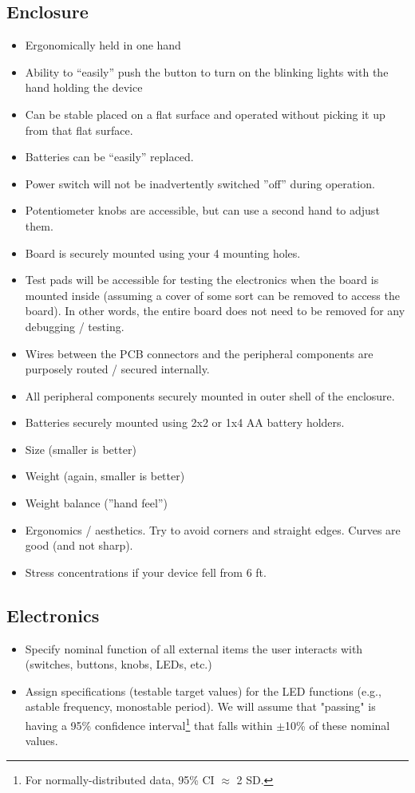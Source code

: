 \documentclass[10pt]{article}
\begin{document}
\subsection{Enclosure}
\begin{itemize}
    \item Ergonomically held in one hand
    \item Ability to “easily” push the button to turn on the blinking lights with the hand holding the device
    \item Can be stable placed on a flat surface and operated without picking it up from that flat surface.
    \item Batteries can be “easily” replaced.
    \item Power switch will not be inadvertently switched ”off” during operation.
    \item Potentiometer knobs are accessible, but can use a second hand to adjust them.
    \item Board is securely mounted using your 4 mounting holes.
    \item Test pads will be accessible for testing the electronics when the board is mounted inside (assuming
    a cover of some sort can be removed to access the board). In other words, the entire board does not
    need to be removed for any debugging / testing.
    \item Wires between the PCB connectors and the peripheral components are purposely routed / secured
    internally.
    \item All peripheral components securely mounted in outer shell of the enclosure.
    \item Batteries securely mounted using 2x2 or 1x4 AA battery holders.
    \item Size (smaller is better)
    \item Weight (again, smaller is better)
    \item Weight balance (”hand feel”)
    \item Ergonomics / aesthetics. Try to avoid corners and straight edges. Curves are good (and not sharp).
    \item Stress concentrations if your device fell from 6 ft.
\end{itemize}

\subsection{Electronics}
\begin{itemize}
    \item Specify nominal function of all external items the user interacts with
    (switches, buttons, knobs, LEDs, etc.)
    \item Assign specifications (testable target values) for the LED functions
    (e.g., astable frequency, monostable period).  We will assume that "passing"
    is having a 95\% confidence interval\footnote{For normally-distributed data,
    95\% CI $\approx$ 2 SD.} that falls within $\pm$10\% of these nominal
    values.
\end{itemize}
\end{document}
